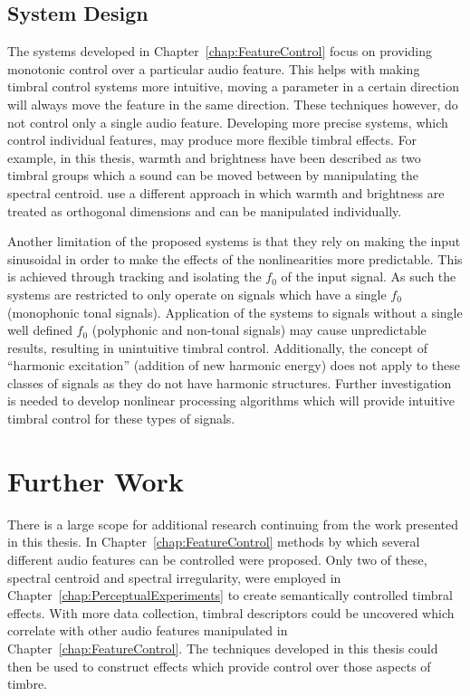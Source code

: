 	\subsection{System Design}
	\label{sec:Conclusion-Critique-SystemDesign}
		The systems developed in Chapter~\ref{chap:FeatureControl} focus on providing monotonic control over a
		particular audio feature. This helps with making timbral control systems more intuitive, moving a parameter
		in a certain direction will always move the feature in the same direction. These techniques however, do not
		control only a single audio feature. Developing more precise systems, which control individual features, may
		produce more flexible timbral effects. For example, in this thesis, warmth and brightness have been
		described as two timbral groups which a sound can be moved between by manipulating the spectral centroid.
		\cite{zacharakis2011an} use a different approach in which warmth and brightness are treated as orthogonal
		dimensions and can be manipulated individually.

		Another limitation of the proposed systems is that they rely on making the input sinusoidal in order to make
		the effects of the nonlinearities more predictable. This is achieved through tracking and isolating the
		$f_{0}$ of the input signal. As such the systems are restricted to only operate on signals which have a
		single $f_{0}$ (monophonic tonal signals). Application of the systems to signals without a single well
		defined $f_{0}$ (polyphonic and non-tonal signals) may cause unpredictable results, resulting in unintuitive
		timbral control. Additionally, the concept of ``harmonic excitation'' (addition of new harmonic energy) does
		not apply to these classes of signals as they do not have harmonic structures. Further investigation is
		needed to develop nonlinear processing algorithms which will provide intuitive timbral control for these
		types of signals.

\section{Further Work}
\label{sec:Conclusion-FurtherWork}
	There is a large scope for additional research continuing from the work presented in this thesis. In
	Chapter~\ref{chap:FeatureControl} methods by which several different audio features can be controlled were proposed.
	Only two of these, spectral centroid and spectral irregularity, were employed in
	Chapter~\ref{chap:PerceptualExperiments} to create semantically controlled timbral effects. With more data
	collection, timbral descriptors could be uncovered which correlate with other audio features manipulated in
	Chapter~\ref{chap:FeatureControl}. The techniques developed in this thesis could then be used to construct effects
	which provide control over those aspects of timbre.

